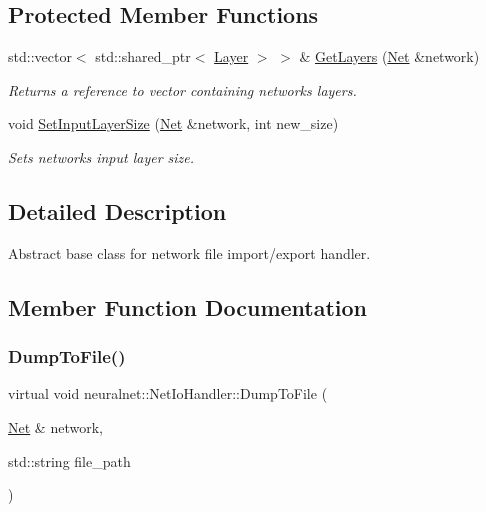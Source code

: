 \subsection*{Protected Member Functions}
\begin{DoxyCompactItemize}
\item 
\mbox{\label{classneuralnet_1_1NetIoHandler_a9b97efd5e9e64a9b9073b5b6675809b2}} 
std\+::vector$<$ std\+::shared\+\_\+ptr$<$ \hyperlink{classneuralnet_1_1Layer}{Layer} $>$ $>$ \& \hyperlink{classneuralnet_1_1NetIoHandler_a9b97efd5e9e64a9b9073b5b6675809b2}{Get\+Layers} (\hyperlink{classneuralnet_1_1Net}{Net} \&network)
\begin{DoxyCompactList}\small\item\em Return\textquotesingle{}s a reference to vector containing network\textquotesingle{}s layers. \end{DoxyCompactList}\item 
\mbox{\label{classneuralnet_1_1NetIoHandler_a62dbf1b1c008aba6e1d05e0ac5443303}} 
void \hyperlink{classneuralnet_1_1NetIoHandler_a62dbf1b1c008aba6e1d05e0ac5443303}{Set\+Input\+Layer\+Size} (\hyperlink{classneuralnet_1_1Net}{Net} \&network, int new\+\_\+size)
\begin{DoxyCompactList}\small\item\em Sets network\textquotesingle{}s input layer size. \end{DoxyCompactList}\end{DoxyCompactItemize}


\subsection{Detailed Description}
Abstract base class for network file import/export handler. 

\subsection{Member Function Documentation}
\mbox{\label{classneuralnet_1_1NetIoHandler_a580e3b0768346da97ad40464cb62fe5c}} 
\subsubsection{\texorpdfstring{Dump\+To\+File()}{DumpToFile()}}
{\footnotesize\ttfamily virtual void neuralnet\+::\+Net\+Io\+Handler\+::\+Dump\+To\+File (\begin{DoxyParamCaption}\item[{\hyperlink{classneuralnet_1_1Net}{Net} \&}]{network,  }\item[{std\+::string}]{file\+\_\+path }\end{DoxyParamCaption})\hspace{0.3cm}{\ttfamily [pure virtual]}}



